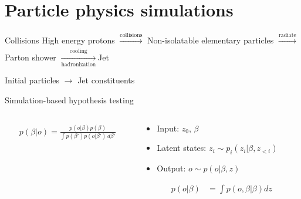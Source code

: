 \documentclass[handout, aspectratio=169,xcolor=dvipsnames]{beamer}
\begin{document}
\begin{frame}[plain]
  \titlepage
\end{frame}

\begin{frame}[plain]
  \tableofcontents
\end{frame}

\section{Particle physics simulations}
\begin{frame}{Collisions}
  \centering
  High energy protons \pause $\xrightarrow[]{\text{collisions}}$ Non-isolatable elementary particles \pause $\xrightarrow[]{\text{radiate}}$ Parton shower \pause $\xrightarrow[\text{hadronization}]{\text{cooling}}$Jet

  \vspace{1.5cm}

  \pause Initial particles $\rightarrow$ Jet constituents
\end{frame}

\begin{frame}{Simulation-based hypothesis testing}
    \begin{columns}
   \pause
    \begin{column}{0.5\textwidth}
      \begin{align*}
        p(\beta | o) = \frac{p(o|\beta)p(\beta)}{\int p(\beta') p(o | \beta') \, d\beta'}\\
      \end{align*}
    \end{column}
    \pause
    \begin{column}{0.5\textwidth}
      \begin{itemize}
        \item Input: $z_0$, $\beta$
        \pause
        \item Latent states: $z_i \sim p_i (z_i | \beta, z_{<i})$
        \pause
        \item Output: $o \sim p(o | \beta, z)$
      \end{itemize}
      \pause
      \begin{align*}
          p(o | \beta) &= \int  p(o, \beta | \beta) dz
      \end{align*}
    \end{column}
   
  \end{columns}
  
  \end{frame}
\end{document}
